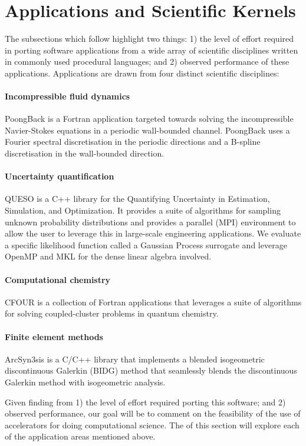 \section{Applications and Scientific Kernels}
\label{sec:apps}

The subsections which follow highlight two things: 1) the level of effort
required in porting software applications from a wide array of scientific
disciplines written in commonly used procedural languages; and 2) observed
performance of these applications.  Applications are drawn from four distinct
scientific disciplines:

\paragraph{Incompressible fluid dynamics}  PoongBack is a Fortran application
targeted towards solving the incompressible Navier-Stokes equations in a
periodic wall-bounded channel.  PoongBack uses a Fourier spectral
discretisation in the periodic directions and a B-spline discretisation in the
wall-bounded direction.

\paragraph{Uncertainty quantification}  QUESO is a C++ library for the
Quantifying Uncertainty in Estimation, Simulation, and Optimization.  It
provides a suite of algorithms for sampling unknown probability distributions
and provides a parallel (MPI) environment to allow the user to leverage this in
large-scale engineering applications.  We evaluate a specific likelihood
function called a Gaussian Process surrogate and leverage OpenMP and MKL for
the dense linear algebra involved.

\paragraph{Computational chemistry}  CFOUR is a collection of Fortran
applications that leverages a suite of algorithms for solving coupled-cluster
problems in quantum chemistry.

\paragraph{Finite element methods}  ArcSyn3sis is a C/C++ library that implements
a blended isogeometric discontinuous Galerkin (BIDG) method that seamlessly
blends the discontinuous Galerkin method with isogeometric analysis.

Given finding from 1) the level of effort required porting this software; and
2) observed performance, our goal will be to comment on the feasibility of the
use of accelerators for doing computational science.  The of this section will
explore each of the application areas mentioned above.
